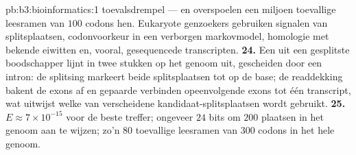 \begin{solution}{pb:b3:bioinformatics:1}
toevalsdrempel --- en overspoelen een miljoen toevallige leesramen van
$100$ codons hen. Eukaryote genzoekers gebruiken signalen van
splitsplaatsen, codonvoorkeur in een verborgen markovmodel, homologie
met bekende eiwitten en, vooral, gesequencede transcripten.
\textbf{24.} Een  uit een gesplitste boodschapper lijnt in twee
stukken op het genoom uit, gescheiden door een intron: de splitsing
markeert beide splitsplaatsen tot op de base; de readdekking bakent de
exons af en gepaarde  verbinden opeenvolgende exons tot één
transcript, wat uitwijst welke van verscheidene kandidaat-splitsplaatsen
wordt gebruikt.
\textbf{25.} $E \approx 7\times 10^{-15}$ voor de beste treffer;
ongeveer $24$ bits om $200$ plaatsen in het genoom aan te wijzen; zo'n
$80$ toevallige leesramen van $300$ codons in het hele genoom.
\end{solution}
